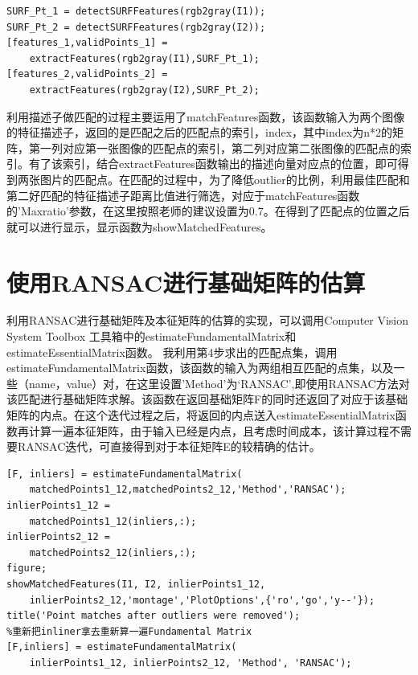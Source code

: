 \begin{lstlisting}
SURF_Pt_1 = detectSURFFeatures(rgb2gray(I1));
SURF_Pt_2 = detectSURFFeatures(rgb2gray(I2));
[features_1,validPoints_1] = 
    extractFeatures(rgb2gray(I1),SURF_Pt_1);
[features_2,validPoints_2] =   
    extractFeatures(rgb2gray(I2),SURF_Pt_2);
\end{lstlisting}

利用描述子做匹配的过程主要运用了matchFeatures函数，该函数输入为两个图像的特征描述子，返回的是匹配之后的匹配点的索引，index，其中index为n*2的矩阵，第一列对应第一张图像的匹配点的索引，第二列对应第二张图像的匹配点的索引。有了该索引，结合extractFeatures函数输出的描述向量对应点的位置，即可得到两张图片的匹配点。在匹配的过程中，为了降低outlier的比例，利用最佳匹配和第二好匹配的特征描述子距离比值进行筛选，对应于matchFeatures函数的'Maxratio'参数，在这里按照老师的建议设置为0.7。在得到了匹配点的位置之后就可以进行显示，显示函数为showMatchedFeatures。

\section{使用RANSAC进行基础矩阵的估算}
利用RANSAC进行基础矩阵及本征矩阵的估算的实现，可以调用Computer Vision System Toolbox 工具箱中的estimateFundamentalMatrix和estimateEssentialMatrix函数。
我利用第4步求出的匹配点集，调用estimateFundamentalMatrix函数，该函数的输入为两组相互匹配的点集，以及一些（name，value）对，在这里设置’Method’为‘RANSAC’,即使用RANSAC方法对该匹配进行基础矩阵求解。该函数在返回基础矩阵F的同时还返回了对应于该基础矩阵的内点。在这个迭代过程之后，将返回的内点送入estimateEssentialMatrix函数再计算一遍本征矩阵，由于输入已经是内点，且考虑时间成本，该计算过程不需要RANSAC迭代，可直接得到对于本征矩阵E的较精确的估计。

\begin{lstlisting}
[F, inliers] = estimateFundamentalMatrix(
    matchedPoints1_12,matchedPoints2_12,'Method','RANSAC');
inlierPoints1_12 = 
    matchedPoints1_12(inliers,:);
inlierPoints2_12 = 
    matchedPoints2_12(inliers,:);
figure;
showMatchedFeatures(I1, I2, inlierPoints1_12,
    inlierPoints2_12,'montage','PlotOptions',{'ro','go','y--'});
title('Point matches after outliers were removed');
%重新把inliner拿去重新算一遍Fundamental Matrix
[F,inliers] = estimateFundamentalMatrix(
    inlierPoints1_12, inlierPoints2_12, 'Method', 'RANSAC');
\end{lstlisting}

